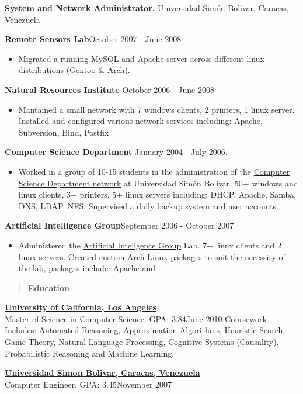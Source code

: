 \documentclass[10pt]{article}
\newcommand{\vitem}{\vspace*{-.4pc}\item}
\begin{document}
\textbf{System and Network Administrator.} Universidad Simón Bolívar, Caracas, Venezuela

\textbf{Remote Sensors Lab}\hfill October 2007 - June 2008
\begin{itemize}
\vitem Migrated a running MySQL and Apache server across different
  linux distributions (Gentoo \& \href{http://www.archlinux.org/}{Arch}).
\end{itemize}

\noindent\textbf{Natural Resources Institute} \hfill October 2006 - June 2008
\begin{itemize}
\vitem Mantained a small network with 7 windows clients, 2 printers, 1
  linux server. Installed and configured various network services including:
  Apache, Subversion, Bind, Postfix
\end{itemize}

\noindent\textbf{Computer Science Department} \hfill January 2004 -
  July 2006.
\begin{itemize}
\vitem Worked in a group of 10-15 students in the administration of the
  \href{http://www.ldc.usb.ve}{Computer Science Department network}
  at Universidad Simón Bolívar. 50+ windows and linux clients, 3+
  printers, 5+ linux servers including: DHCP, Apache, Samba, DNS,
  LDAP, NFS. Supervised a daily backup system and user accounts.
\end{itemize}

\noindent\textbf{Artificial Intelligence Group}\hfill September 2006 - October 2007
\begin{itemize}
  \vitem Administered the \href{http://www.gia.usb.ve}{Artificial
    Inteligence Group} Lab. 7+ linux clients and 2 linux
  servers. Created custom \href{http://www.archlinux.org/}{Arch Linux}
  packages to suit the necessity of the lab, packages include: Apache
  and \LaTeXe{}
\end{itemize}

\begin{quote}
  \centering{}
 \textbf{Education}
\end{quote}
\href{http://www.ucla.edu}{\textbf{University of California, Los Angeles}}\\
Master of Science in Computer Science. GPA: $3.84$\hfill June 2010
Coursework Includes: Automated Reasoning, Approximation Algorithms,
Heuristic Search, Game Theory, Natural Language Processing, Cognitive
Systems (Causality), Probabilistic Reasoning and Machine Learning.

\noindent\href{http://www.usb.ve}{\textbf{Universidad Simon Bolivar, Caracas, Venezuela}}\\
Computer Engineer. GPA: $3.45$\hfill November 2007
\end{document}
